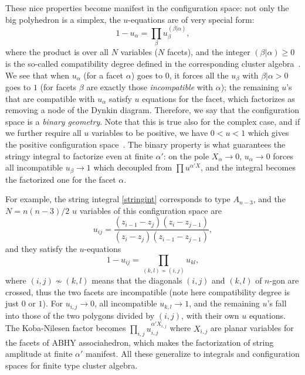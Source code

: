 \documentclass[hidelinks,12pt]{article}
\begin{document}
These nice properties become manifest in the configuration space: not only the big polyhedron is a simplex, the $u$-equations are of very special form:
\begin{equation}\label{perfectu}
	1-u_\alpha=\prod_{\beta} u_\beta^{(\beta|\alpha)},
\end{equation}
where the product is over all $N$ variables ($N$ facets), and the integer $(\beta | \alpha)\geq 0$ is the so-called compatibility degree defined in the corresponding cluster algebra~\cite{}.
We see that when $u_\alpha$ (for a facet $\alpha$) goes to $0$, it forces all the $u_\beta$ with $\beta | \alpha>0$ goes to $1$ (for facets $\beta$ are exactly those {\it incompatible} with $\alpha$); the remaining $u$'s that are compatible with $u_\alpha$ satisfy $u$ equations for the facet, which factorizes as removing a node of the Dynkin diagram. Therefore, we say that the configuration space is a {\it binary geometry}. Note that this is true also for the complex case, and if we further require all $u$ variables to be positive, we have $0<u<1$ which gives the positive configuration space~\cite{}. The binary property is what guarantees the stringy integral to factorize even at finite $\alpha'$: on the pole $X_\alpha \to 0$, $u_\alpha\to 0$ forces all incompatible $u_\beta\to 1$ which decoupled from $\prod u^{\alpha' X}$, and the integral becomes the factorized one for the facet $\alpha$. 

For example, the string integral \eqref{stringint} corresponds to type $A_{n{-}3}$, %
and the $N=n(n{-}3)/2$ $u$ variables of this configuration space are~\cite{}
\[
	u_{i j}=\frac{(z_{i-1}-z_j)(z_i-z_{j-1})}{(z_i-z_j)(z_{i-1}-z_{j-1})},
\]
and they satisfy the $u$-equations
\[
	1-u_{ij}=\prod_{(k,l)\not\sim (i,j)}u_{kl},
\]
where $(i,j)\not\sim (k,l)$ means that the diagonals $(i,j)$ and $(k,l)$ of $n$-gon are crossed, thus the two facets are incompatible (note here compatibility degree is just $0$ or $1$).  For $u_{i,j}\to 0$, all incompatible $u_{k,l} \to 1$, and the remaining $u$'s fall into those of the two polygons divided by $(i,j)$, with their own $u$ equations. The Koba-Nilesen factor becomes $\prod_{i,j} u_{i,j}^{\alpha' X_{i,j}}$ where $X_{i,j}$ are planar variables for the facets of ABHY associahedron, which makes the factorization of string amplitude at finite $\alpha'$ manifest. All these generalize to integrals and configuration spaces for finite type cluster algebra. 
\end{document}
